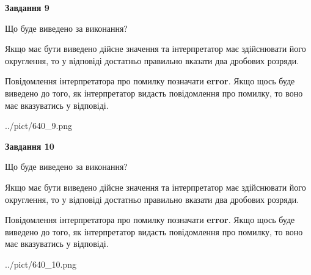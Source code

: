 \documentclass[12pt, ukrainian]{article}
\begin{document}
{\begin {Large}
{\begin {center}\textbf{Завдання 9}\end {center}}\par
Що буде виведено за виконання? \par

Якщо має бути виведено дійсне значення та інтерпретатор має здійснювати його округлення, 
то у відповіді достатньо правильно вказати два дробових розряди.

Повідомлення інтерпретатора про помилку позначати \textbf{error}.
Якщо щось буде виведено до того, як інтерпретатор видасть повідомлення про помилку, 
то воно має вказуватись у відповіді. \par

\begin{center}
	{../pict/640_9.png}
\end{center}
\newpage

{\begin {center}\textbf{Завдання 10}\end {center}}\par
Що буде виведено за виконання? \par

Якщо має бути виведено дійсне значення та інтерпретатор має здійснювати його округлення, 
то у відповіді достатньо правильно вказати два дробових розряди.

Повідомлення інтерпретатора про помилку позначати \textbf{error}.
Якщо щось буде виведено до того, як інтерпретатор видасть повідомлення про помилку, 
то воно має вказуватись у відповіді. \par

\begin{center}
	{../pict/640_10.png}
\end{center}
\newpage

\end {Large}}
\end{document}
